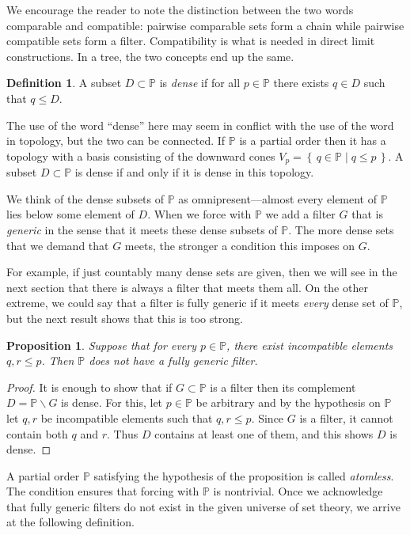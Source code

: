 \documentclass[11pt,oneside]{amsbook}
\newcommand{\set}[1]{\left\{\,#1\,\right\}}
\newcommand{\PP}{\mathbb P}
\theoremstyle{definition}
\theoremstyle{plain}
\newtheorem{prop}[thm]{Proposition}
\theoremstyle{definition}
\newtheorem{defn}[thm]{Definition}
\theoremstyle{remark}
\begin{document}
We encourage the reader to note the distinction between the two words comparable and compatible: pairwise comparable sets form a chain while pairwise compatible sets form a filter. Compatibility is what is needed in direct limit constructions. In a tree, the two concepts end up the same.

\begin{defn}
  A subset $D\subset\PP$ is \emph{dense} if for all $p\in\PP$ there exists $q\in D$ such that $q\leq D$.
\end{defn}

The use of the word ``dense'' here may seem in conflict  with the use of the word in topology, but the two can be connected. If $\PP$ is a partial order then it has a topology with a basis consisting of the downward cones $V_p=\set{q\in\PP\mid q\leq p}$. A subset $D\subset\PP$ is dense if and only if it is dense in this topology.

We think of the dense subsets of $\PP$ as omnipresent---almost every element of $\PP$ lies below some element of $D$. When we force with $\PP$ we add a filter $G$ that is \emph{generic} in the sense that it meets these dense subsets of $\PP$. The more dense sets that we demand that $G$ meets, the stronger a condition this imposes on $G$.

For example, if just countably many dense sets are given, then we will see in the next section that there is always a filter that meets them all. On the other extreme, we could say that a filter is fully generic if it meets \emph{every} dense set of $\PP$, but the next result shows that this is too strong.

\begin{prop}
  \label{prop:generic-new}
  Suppose that for every $p\in\PP$, there exist incompatible elements $q,r\leq p$. Then $\PP$ does not have a fully generic filter.
\end{prop}

\begin{proof}
  It is enough to show that if $G\subset\PP$ is a filter then its complement $D=\PP\smallsetminus G$ is dense. For this, let $p\in\PP$ be arbitrary and by the hypothesis on $\PP$ let $q,r$ be incompatible elements such that $q,r\leq p$. Since $G$ is a filter, it cannot contain both $q$ and $r$. Thus $D$ contains at least one of them, and this shows $D$ is dense.
\end{proof}

A partial order $\PP$ satisfying the hypothesis of the proposition is called \emph{atomless}. The condition ensures that forcing with $\PP$ is nontrivial. Once we acknowledge that fully generic filters do not exist in the given universe of set theory, we arrive at the following definition.
\end{document}
